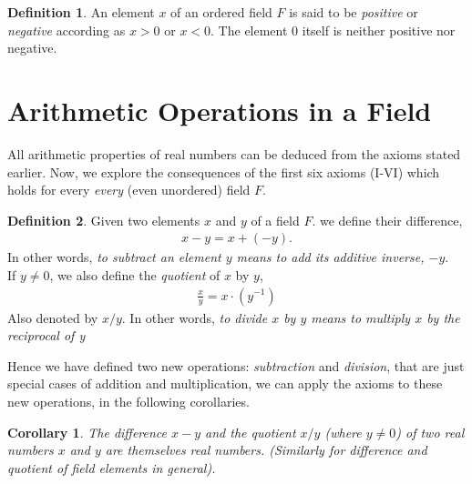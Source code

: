 \documentclass[12pt]{book}
\newtheorem{corollary}{Corollary}
\theoremstyle{definition}
\newtheorem{definition}{Definition}[section]
\begin{document}
\begin{definition}
An element $x$ of an ordered field $F$ is said to be \textit{positive} or \textit{negative} according as $x>0$ or $x<0$. The element $0$ itself is neither positive nor negative. 	
\end{definition}

\section{Arithmetic Operations in a Field}

All arithmetic properties of real numbers can be deduced from the axioms stated earlier. Now, we explore the consequences of the first six axioms (I-VI) which holds for every \textit{every} (even unordered) field $F$.

\begin{definition}
Given two elements $x$ and $y$ of a field $F$. we define their difference,
\begin{align*}
x-y = x +(-y).	
\end{align*}
In other words, \textit{to subtract an element $y$ means to add its additive inverse, $-y$}.\\
If $y \neq 0$, we also define the \textit{quotient} of $x$  by $y$,
\begin{align*}
\frac{x}{y} = x \cdot (y^{-1})	
\end{align*}
Also denoted by $x/y$. In other words, \textit{to divide $x$ by $y$ means to multiply $x$ by the reciprocal of y}
\end{definition} 
Hence we have defined two new operations: \textit{subtraction} and \textit{division}, that are just special cases of addition and multiplication, we can apply the axioms to these new operations, in the following corollaries. 


\begin{corollary}
	The difference $x-y$ and the quotient $x/y$ (where $y \neq 0$) of two real numbers $x$ and $y$ are themselves real numbers. (Similarly for difference and quotient of field elements in general). 
\end{corollary}
\end{document}
